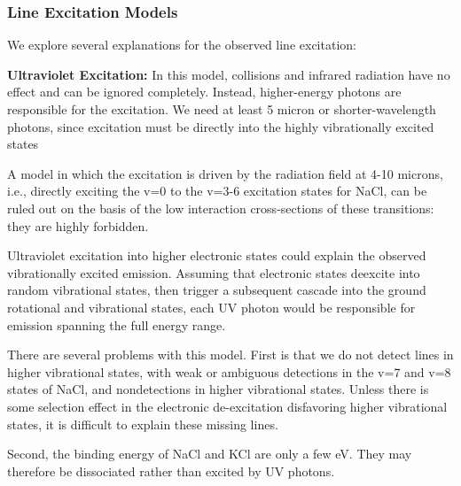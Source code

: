 \documentclass[twocolumn]{aastex62}
\begin{document}

\subsubsection{Line Excitation Models}
We explore several explanations for the observed line excitation:

\par{\textbf{Ultraviolet Excitation:}}
In this model, collisions and infrared radiation have no effect and can be
ignored completely.  Instead, higher-energy photons are responsible for the
excitation.  We need at least 5 micron or shorter-wavelength photons, since
excitation must be directly into the highly vibrationally excited states

A model in which the excitation is driven by the radiation field at 4-10 microns,
i.e., directly exciting the v=0 to the v=3-6 excitation states for NaCl,
can be ruled out on the basis of the low interaction cross-sections of these
transitions: they are highly forbidden.

Ultraviolet excitation into higher electronic states could explain the observed
vibrationally excited emission.  Assuming that electronic states deexcite into
random vibrational states, then trigger a subsequent cascade into the ground
rotational and vibrational states, each UV photon would be responsible for emission
spanning the full energy range.

There are several problems with this model.  First is that we do not detect lines
in higher vibrational states, with weak or ambiguous detections in the v=7 and v=8 
states of NaCl, and nondetections in higher vibrational states.  Unless there is
some selection effect in the electronic de-excitation disfavoring higher vibrational
states, it is difficult to explain these missing lines.  

Second, the binding energy of NaCl and KCl are only a few eV.  They may therefore
be dissociated rather than excited by UV photons.
\end{document}
